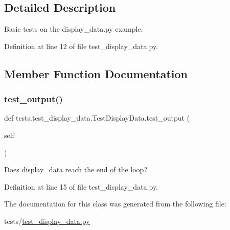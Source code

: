 \subsection{Detailed Description}
\begin{DoxyVerb}Basic tests on the display_data.py example.\end{DoxyVerb}
 

Definition at line 12 of file test\+\_\+display\+\_\+data.\+py.



\subsection{Member Function Documentation}
\mbox{\label{classtests_1_1test__display__data_1_1TestDisplayData_ad9482f68927957ca12e22f14b5b096a0}} 
\subsubsection{\texorpdfstring{test\+\_\+output()}{test\_output()}}
{\footnotesize\ttfamily def tests.\+test\+\_\+display\+\_\+data.\+Test\+Display\+Data.\+test\+\_\+output (\begin{DoxyParamCaption}\item[{}]{self }\end{DoxyParamCaption})}

\begin{DoxyVerb}Does display_data reach the end of the loop?\end{DoxyVerb}
 

Definition at line 15 of file test\+\_\+display\+\_\+data.\+py.



The documentation for this class was generated from the following file\+:\begin{DoxyCompactItemize}
\item 
tests/\hyperlink{test__display__data_8py}{test\+\_\+display\+\_\+data.\+py}\end{DoxyCompactItemize}
